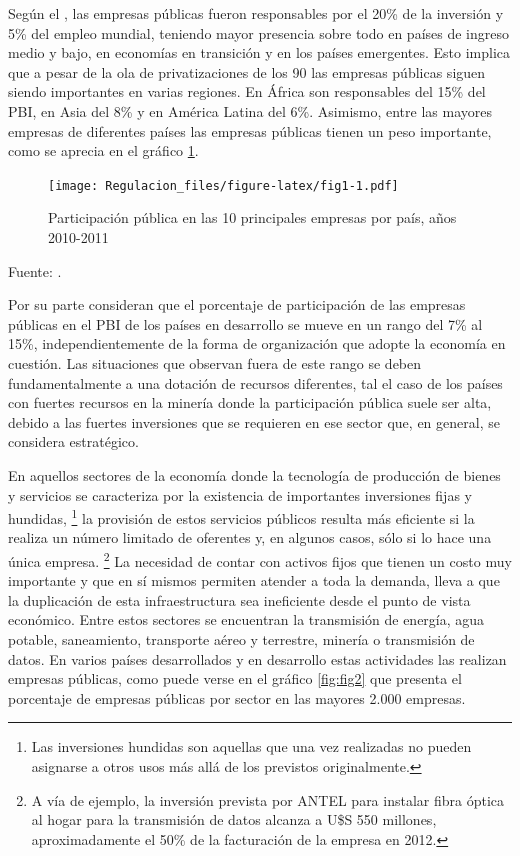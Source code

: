 \documentclass[
  12pt,
  spanish,
]{book}
\begin{document}
Según el \citet{Robinett2006}, las empresas públicas fueron responsables por el 20\% de la inversión y 5\% del empleo mundial, teniendo mayor presencia sobre todo en países de ingreso medio y bajo, en economías en transición y en los países emergentes. Esto implica que a pesar de la ola de privatizaciones de los 90 las empresas públicas siguen siendo importantes en varias regiones. En África son responsables del 15\% del PBI, en Asia del 8\% y en América Latina del 6\%. Asimismo, entre las mayores empresas de diferentes países las empresas públicas tienen un peso importante, como se aprecia en el gráfico \ref{fig:fig1}.

\begin{figure}
\centering
\texttt{[image: Regulacion\_files/figure-latex/fig1-1.pdf]}
\caption{\label{fig:fig1}Participación pública en las 10 principales empresas por país, años 2010-2011}
\end{figure}

Fuente: \citet{Kowalski2013}.

Por su parte \citet{Jones1982} consideran que el porcentaje de participación de las empresas públicas en el PBI de los países en desarrollo se mueve en un rango del 7\% al 15\%, independientemente de la forma de organización que
adopte la economía en cuestión. Las situaciones que observan fuera de este rango se deben fundamentalmente a una dotación de recursos diferentes, tal el caso de los países con fuertes recursos en la minería donde la participación pública suele ser alta, debido a las fuertes inversiones que se requieren en ese sector que, en general, se considera estratégico.

En aquellos sectores de la economía donde la tecnología de producción de bienes y servicios se caracteriza por la existencia de importantes inversiones fijas y hundidas,
\footnote{Las inversiones hundidas son aquellas que una vez realizadas no pueden asignarse a otros usos más allá de los previstos originalmente.}
la provisión de estos servicios públicos resulta más eficiente si la realiza un número limitado de oferentes y, en algunos casos, sólo si lo hace una única empresa.
\footnote{A vía de ejemplo, la inversión prevista por ANTEL para instalar fibra óptica al hogar para la transmisión de datos alcanza a U\$S 550 millones, aproximadamente el 50\% de la facturación de la empresa en 2012.}
La necesidad de contar con activos fijos que tienen un costo muy importante y que en sí mismos permiten atender a toda la demanda, lleva a que la duplicación de esta infraestructura sea ineficiente desde el punto de
vista económico. Entre estos sectores se encuentran la transmisión de energía, agua potable, saneamiento, transporte aéreo y terrestre, minería o transmisión de datos. En varios países desarrollados y en desarrollo estas actividades las realizan empresas públicas, como puede verse en el gráfico \ref{fig:fig2} que presenta el porcentaje de empresas públicas por sector en las mayores 2.000 empresas.
\end{document}
